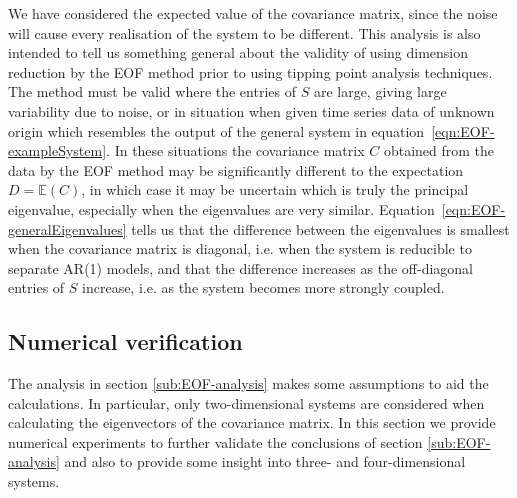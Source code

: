We have considered the expected value of the covariance matrix, since the noise will cause every realisation of the system to be different. This analysis is also intended to tell us something general about the validity of using dimension reduction by the EOF method prior to using tipping point analysis techniques. The method must be valid where the entries of $S$ are large, giving large variability due to noise, or in situation when given time series data of unknown origin which resembles the output of the general system in equation~\ref{eqn:EOF-exampleSystem}. In these situations the covariance matrix $C$ obtained from the data by the EOF method may be significantly different to the expectation $D = \mathbb{E}(C)$, in which case it may be uncertain which is truly the principal eigenvalue, especially when the eigenvalues are very similar. Equation~\ref{eqn:EOF-generalEigenvalues} tells us that the difference between the eigenvalues is smallest when the covariance matrix is diagonal, i.e. when the system is reducible to separate AR(1) models, and that the difference increases as the off-diagonal entries of $S$ increase, i.e. as the system becomes more strongly coupled.

\subsection{Numerical verification}
\label{sub:EOF-verification}
The analysis in section \ref{sub:EOF-analysis} makes some assumptions to aid the calculations. In particular, only two-dimensional systems are considered when calculating the eigenvectors of the covariance matrix. In this section we provide numerical experiments to further validate the conclusions of section \ref{sub:EOF-analysis} and also to provide some insight into three- and four-dimensional systems. 

